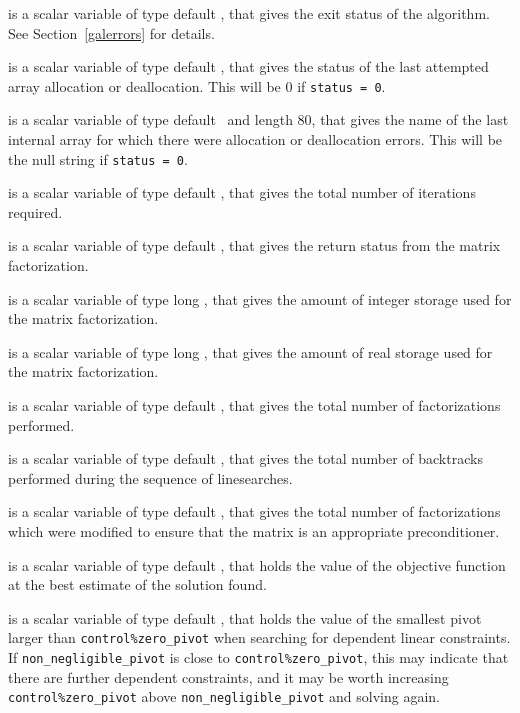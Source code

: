 \begin{description}

 is a scalar variable of type default \integer, that gives the
exit status of the algorithm.
See Section~\ref{galerrors}
for details.

 is a scalar variable of type default \integer, that gives
the status of the last attempted array allocation or deallocation.
This will be 0 if {\tt status = 0}.

 is a scalar variable of type default \character\
and length 80, that  gives the name of the last internal array
for which there were allocation or deallocation errors.
This will be the null string if {\tt status = 0}.

 is a scalar variable of type default \integer, that gives the
total number of iterations required.

 is a scalar variable of type default \integer, that
gives the return status from the matrix factorization.

 is a scalar variable of type long
\integer, that gives the amount of integer storage used for the matrix
factorization.

 is a scalar variable of type long \integer,
that gives the amount of real storage used for the matrix factorization.

 is a scalar variable of type default \integer, that gives the
total number of factorizations performed.

 is a scalar variable of type default \integer, that gives the
total number of backtracks performed during the sequence of linesearches.

 is a scalar variable of type default \integer, that gives the
total number of factorizations which were modified to
ensure that the matrix is an appropriate preconditioner.

 is a scalar variable of type default \realdp, that holds the
value of the objective function at the best estimate of the solution found.

 is a scalar variable of type default \realdp,
that holds the value of the smallest pivot larger than {\tt control\%zero\_pivot}
when searching for dependent linear constraints. If
{\tt non\_negligible\_pivot} is close to  {\tt control\%zero\_pivot},
this may indicate that there are further dependent constraints, and
it may be worth increasing {\tt control\%zero\_pivot} above
{\tt non\_negligible\_pivot} and solving again.


\end{description}
